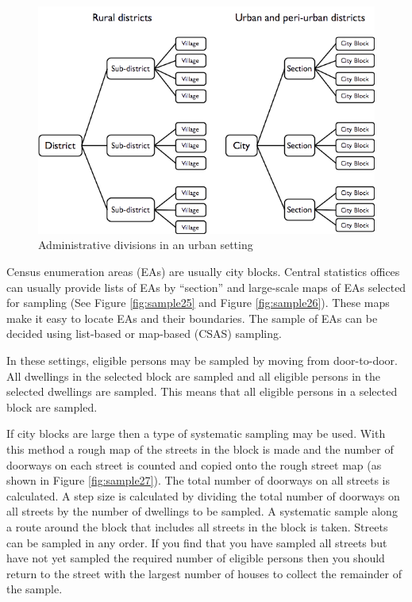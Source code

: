 \documentclass[12pt,a4paper]{book}
\theoremstyle{definition}
\theoremstyle{definition}
\theoremstyle{definition}
\theoremstyle{remark}
\begin{document}
\begin{figure}[H]

{\centering \includegraphics[width=8.38in]{figures/stage2sample10} 

}

\caption{Administrative divisions in an urban setting}\label{fig:sample24}
\end{figure}

Census enumeration areas (EAs) are usually city blocks. Central
statistics offices can usually provide lists of EAs by ``section'' and
large-scale maps of EAs selected for sampling (See Figure
\ref{fig:sample25} and Figure \ref{fig:sample26}). These maps make it
easy to locate EAs and their boundaries. The sample of EAs can be
decided using list-based or map-based (CSAS) sampling.

In these settings, eligible persons may be sampled by moving from
door-to-door. All dwellings in the selected block are sampled and all
eligible persons in the selected dwellings are sampled. This means that
all eligible persons in a selected block are sampled.

If city blocks are large then a type of systematic sampling may be used.
With this method a rough map of the streets in the block is made and the
number of doorways on each street is counted and copied onto the rough
street map (as shown in Figure \ref{fig:sample27}). The total number of
doorways on all streets is calculated. A step size is calculated by
dividing the total number of doorways on all streets by the number of
dwellings to be sampled. A systematic sample along a route around the
block that includes all streets in the block is taken. Streets can be
sampled in any order. If you find that you have sampled all streets but
have not yet sampled the required number of eligible persons then you
should return to the street with the largest number of houses to collect
the remainder of the sample.
\end{document}
